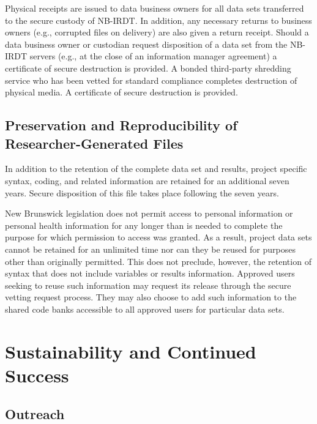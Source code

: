 Physical receipts are issued to data business owners for all data sets transferred to the secure custody of NB-IRDT. In addition, any necessary returns to business owners (e.g., corrupted files on delivery) are also given a return receipt. Should a data business owner or custodian request disposition of a data set from the NB-IRDT servers (e.g., at the close of an information manager agreement) a certificate of secure destruction is provided. A bonded third-party shredding service who has been vetted for standard compliance completes destruction of physical media. A certificate of secure destruction is provided.

\hypertarget{nbirdt-generatedfile}{%
\subsection{Preservation and Reproducibility of Researcher-Generated Files}\label{nbirdt-generatedfile}}

In addition to the retention of the complete data set and results, project specific syntax, coding, and related information are retained for an additional seven years. Secure disposition of this file takes place following the seven years.

New Brunswick legislation does not permit access to personal information or personal health information for any longer than is needed to complete the purpose for which permission to access was granted. As a result, project data sets cannot be retained for an unlimited time nor can they be reused for purposes other than originally permitted. This does not preclude, however, the retention of syntax that does not include variables or results information. Approved users seeking to reuse such information may request its release through the secure vetting request process. They may also choose to add such information to the shared code banks accessible to all approved users for particular data sets.

\hypertarget{nbirdt-sustain}{%
\section{Sustainability and Continued Success}\label{nbirdt-sustain}}

\hypertarget{nbirdt-outreach}{%
\subsection{Outreach}\label{nbirdt-outreach}}

